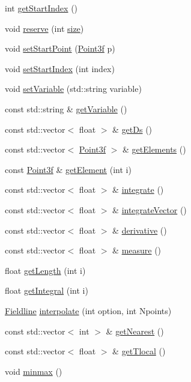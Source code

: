 \begin{DoxyCompactItemize}
\item 
int \hyperlink{classccmc_1_1_fieldline_ab629c0bb298a816b2a6af5a95d9e288e}{get\-Start\-Index} ()
\item 
void \hyperlink{classccmc_1_1_fieldline_a7a4edd677b1e1542166ac0aad783087e}{reserve} (int \hyperlink{classccmc_1_1_fieldline_abc4b63ac9b72acd2e6f26b51f659500c}{size})
\item 
void \hyperlink{classccmc_1_1_fieldline_a1bbfa14097ea4e6cb854b68a603eb891}{set\-Start\-Point} (\hyperlink{classccmc_1_1_point3f}{Point3f} p)
\item 
void \hyperlink{classccmc_1_1_fieldline_ab979de578ae2e0a40907d0c90f273f0c}{set\-Start\-Index} (int index)
\item 
void \hyperlink{classccmc_1_1_fieldline_a9fa22375c1276932380a259952f966ca}{set\-Variable} (std\-::string variable)
\item 
const std\-::string \& \hyperlink{classccmc_1_1_fieldline_a9403dca3b1c98f35f9e9bb5cc340bd3a}{get\-Variable} ()
\item 
const std\-::vector$<$ float $>$ \& \hyperlink{classccmc_1_1_fieldline_af89e2d72b06b4e7157d3f7e5ac1b4928}{get\-Ds} ()
\item 
const std\-::vector$<$ \hyperlink{classccmc_1_1_point3f}{Point3f} $>$ \& \hyperlink{classccmc_1_1_fieldline_ad238f0bd5cda88ec64bbd7fa951cee87}{get\-Elements} ()
\item 
const \hyperlink{classccmc_1_1_point3f}{Point3f} \& \hyperlink{classccmc_1_1_fieldline_a0ef624f19c2f6268c1539fe8a5246ffb}{get\-Element} (int i)
\item 
const std\-::vector$<$ float $>$ \& \hyperlink{classccmc_1_1_fieldline_ae0923bc16ca3181c3d3a7c46c5cad55a}{integrate} ()
\item 
const std\-::vector$<$ float $>$ \& \hyperlink{classccmc_1_1_fieldline_a27b68c12e493ddd49036010cb5bc8069}{integrate\-Vector} ()
\item 
const std\-::vector$<$ float $>$ \& \hyperlink{classccmc_1_1_fieldline_a360a20c0b4e4f39d11545ca22a06199a}{derivative} ()
\item 
const std\-::vector$<$ float $>$ \& \hyperlink{classccmc_1_1_fieldline_a39cd6708e840c29c4e85b445fb14e017}{measure} ()
\item 
float \hyperlink{classccmc_1_1_fieldline_a15e1c45287ad52604fc681c40b02c3c2}{get\-Length} (int i)
\item 
float \hyperlink{classccmc_1_1_fieldline_afd11cbe0d7332baaa2f659e909e9206b}{get\-Integral} (int i)
\item 
\hyperlink{classccmc_1_1_fieldline}{Fieldline} \hyperlink{classccmc_1_1_fieldline_a3c641db4971a6cbcce5ef3fb0bc3e01d}{interpolate} (int option, int Npoints)
\item 
const std\-::vector$<$ int $>$ \& \hyperlink{classccmc_1_1_fieldline_a69dbf2cdbb0bd332e07d605545094441}{get\-Nearest} ()
\item 
const std\-::vector$<$ float $>$ \& \hyperlink{classccmc_1_1_fieldline_aab3aa25ca4f65e88eeecfb4b1376e3b5}{get\-Tlocal} ()
\item 
void \hyperlink{classccmc_1_1_fieldline_a53d2fbcbc58652b7573315ed4f3f6850}{minmax} ()
\end{DoxyCompactItemize}
